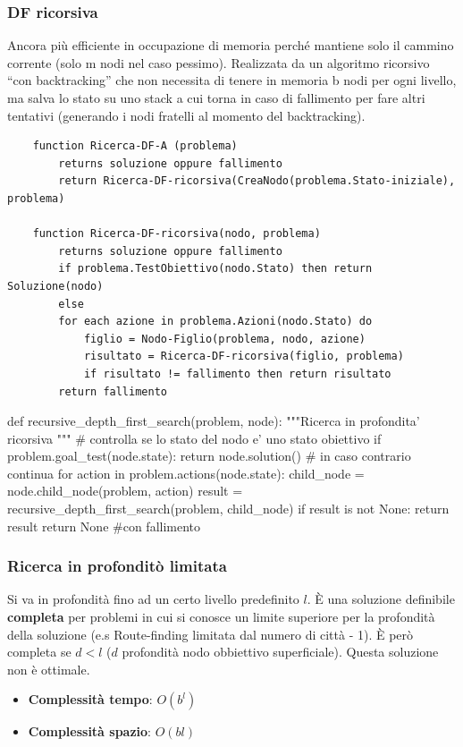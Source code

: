 \subsubsection{DF ricorsiva}
Ancora più efficiente in occupazione di memoria perché mantiene solo il cammino corrente (solo m nodi nel caso pessimo).
Realizzata da un algoritmo ricorsivo “con backtracking” che non necessita di tenere in memoria b nodi per ogni livello, ma salva lo stato su uno stack a cui torna in caso di fallimento 
per fare altri tentativi (generando i nodi fratelli al momento del backtracking).
\begin{lstlisting}
	function Ricerca-DF-A (problema)
		returns soluzione oppure fallimento
		return Ricerca-DF-ricorsiva(CreaNodo(problema.Stato-iniziale), problema)
		
	function Ricerca-DF-ricorsiva(nodo, problema)
		returns soluzione oppure fallimento
		if problema.TestObiettivo(nodo.Stato) then return Soluzione(nodo)
		else
		for each azione in problema.Azioni(nodo.Stato) do
			figlio = Nodo-Figlio(problema, nodo, azione)
			risultato = Ricerca-DF-ricorsiva(figlio, problema)
			if risultato != fallimento then return risultato
		return fallimento
\end{lstlisting}
\begin{python}
	def recursive_depth_first_search(problem, node):
		"""Ricerca in profondita' ricorsiva """
		# controlla se lo stato del nodo e' uno stato obiettivo
		if problem.goal_test(node.state):
			return node.solution()
		# in caso contrario continua
		for action in problem.actions(node.state):
			child_node = node.child_node(problem, action)
			result = recursive_depth_first_search(problem, child_node)
			if result is not None:
				return result
		return None #con fallimento
\end{python}

\subsubsection{Ricerca in profonditò limitata}
Si va in profondità fino ad un certo livello predefinito $l$. È una soluzione definibile
\textbf{completa} per problemi in cui si conosce un limite superiore per la profondità della soluzione 
(e.s Route-finding limitata dal numero di città - 1). È però completa se $d < l$ ($d$ profondità nodo obbiettivo
superficiale). Questa soluzione non è ottimale.
\begin{itemize}
	\item \textbf{Complessità tempo}: $O(b^l)$
	\item \textbf{Complessità spazio}: $O(bl)$
\end{itemize}

